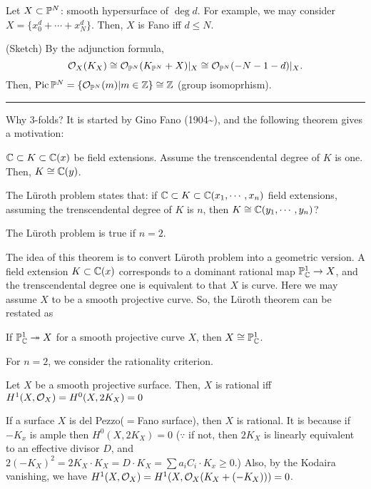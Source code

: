 \documentclass{../../small}
\DeclareMathOperator{\Pic}{Pic}
\begin{document}
\begin{ex}
Let $X\subset\P^N$: smooth hypersurface of $\deg d$.
For example, we may consider $X=\{x_0^d+\cdots+x_N^d\}$.
Then, $X$ is Fano iff $d\le N$.
\end{ex}
\begin{pf}
(Sketch)
By the adjunction formula,
\[\cO_X(K_X)\cong\cO_{\P^N}(K_{\P^N}+X)|_X\cong\cO_{\P^N}(-N-1-d)|_X.\]
Then, $\Pic\P^N=\{\cO_{\P^N}(m)|m\in\Z\}\cong\Z$ (group isomoprhism).
\end{pf}

\smallskip
\hrule
\bigskip

Why 3-folds?
It is started by Gino Fano (1904\sim), and the following theorem gives a motivation:
\begin{thm}[L\"uroth,1876]
$\C\subset K\subset\C(x)$ be field extensions.
Assume the trenscendental degree of $K$ is one.
Then, $K\cong\C(y)$.
\end{thm}
The L\"uroth problem states that: if $\C\subset K\subset\C(x_1,\cdots,x_n)$ field extensions, assuming the trenscendental degree of $K$ is $n$, then $K\cong\C(y_1,\cdots,y_n)$?

\begin{thm}[Castelnuovo, 1886]
The L\"uroth problem is true if $n=2$.
\end{thm}
The idea of this theorem is to convert L\"uroth problem into a geometric version.
A field extension $K\subset\C(x)$ corresponds to a dominant rational map $\P_\C^1\to X$, and the trenscendental degree one is equivalent to that $X$ is curve.
Here we may assume $X$ to be a smooth projective curve.
So, the L\"uroth theorem can be restated as
\begin{thm}
If $\P_\C^1\twoheadrightarrow X$ for a smooth projective curve $X$, then $X\cong\P_\C^1$.
\end{thm}
For $n=2$, we consider the rationality criterion.
\begin{thm}
Let $X$ be a smooth projective surface.
Then, $X$ is rational iff $H^1(X,\cO_X)=H^0(X,2K_X)=0$
\end{thm}
\begin{ex}
If a surface $X$ is del Pezzo($=$Fano surface), then $X$ is rational.
It is because if $-K_x$ is ample then $H^0(X,2K_X)=0$ ($\because$ if not, then $2K_X$ is linearly equivalent to an effective divisor $D$, and $2(-K_X)^2=2K_X\cdot K_X=D\cdot K_X=\sum a_iC_i\cdot K_x\ge0$.)
Also, by the Kodaira vanishing, we have $H^1(X,\cO_X)=H^1(X,\cO_X(K_X+(-K_X)))=0$.
\end{ex}
\end{document}
